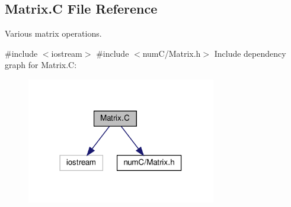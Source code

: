 \hypertarget{Matrix_8C}{}\subsection{Matrix.\+C File Reference}
\label{Matrix_8C}


Various matrix operations.  


{\ttfamily \#include $<$iostream$>$}\newline
{\ttfamily \#include $<$num\+C/\+Matrix.\+h$>$}\newline
Include dependency graph for Matrix.\+C\+:
\nopagebreak
\begin{figure}[H]
\begin{center}
\leavevmode
\includegraphics[width=234pt]{Matrix_8C__incl}
\end{center}
\end{figure}
